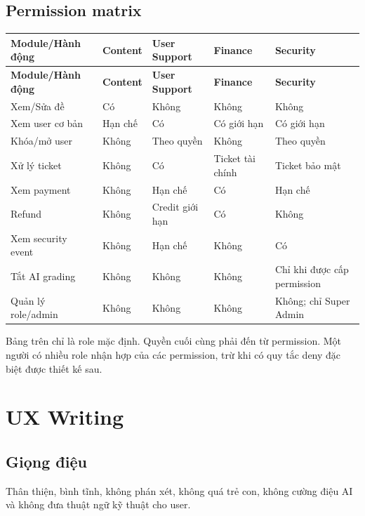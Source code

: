 \documentclass[11pt,a4paper]{article}
\begin{document}
\subsection{Permission matrix}
\small
\begin{longtable}{|P{0.30\textwidth}|P{0.12\textwidth}|P{0.12\textwidth}|P{0.12\textwidth}|P{0.12\textwidth}|}
\hline
\textbf{Module/Hành động} & \textbf{Content} & \textbf{User Support} & \textbf{Finance} & \textbf{Security} \\ \hline
\endfirsthead
\hline
\textbf{Module/Hành động} & \textbf{Content} & \textbf{User Support} & \textbf{Finance} & \textbf{Security} \\ \hline
\endhead
Xem/Sửa đề & Có & Không & Không & Không \\ \hline
Xem user cơ bản & Hạn chế & Có & Có giới hạn & Có giới hạn \\ \hline
Khóa/mở user & Không & Theo quyền & Không & Theo quyền \\ \hline
Xử lý ticket & Không & Có & Ticket tài chính & Ticket bảo mật \\ \hline
Xem payment & Không & Hạn chế & Có & Hạn chế \\ \hline
Refund & Không & Credit giới hạn & Có & Không \\ \hline
Xem security event & Không & Hạn chế & Không & Có \\ \hline
Tắt AI grading & Không & Không & Không & Chỉ khi được cấp permission \\ \hline
Quản lý role/admin & Không & Không & Không & Không; chỉ Super Admin \\ \hline
\end{longtable}
\normalsize

\begin{importantbox}
Bảng trên chỉ là role mặc định. Quyền cuối cùng phải đến từ permission. Một người có nhiều role nhận hợp của các permission, trừ khi có quy tắc deny đặc biệt được thiết kế sau.
\end{importantbox}

\section{UX Writing}

\subsection{Giọng điệu}
Thân thiện, bình tĩnh, không phán xét, không quá trẻ con, không cường điệu AI và không đưa thuật ngữ kỹ thuật cho user.
\end{document}
